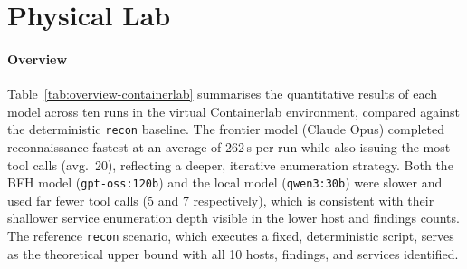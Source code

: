 \section{Physical Lab}\label{sec:eval-physicallab}

\paragraph{Overview}

\begin{table}[H]
    \caption{Nonlinear Model Results}
    \centering

    \label{tab:overview-physicallab}
\end{table}

Table~\ref{tab:overview-containerlab} summarises the quantitative results of each model across ten runs
in the virtual Containerlab environment, compared against the deterministic \texttt{recon} baseline.
The frontier model (Claude Opus) completed reconnaissance fastest at an average of 262\,s per run
while also issuing the most tool calls (avg.\ 20), reflecting a deeper, iterative enumeration strategy.
Both the BFH model (\texttt{gpt-oss:120b}) and the local model (\texttt{qwen3:30b}) were slower
and used far fewer tool calls (5 and 7 respectively), which is consistent with their shallower
service enumeration depth visible in the lower host and findings counts.
The reference \texttt{recon} scenario, which executes a fixed, deterministic script, serves as
the theoretical upper bound with all 10 hosts, findings, and services identified.



